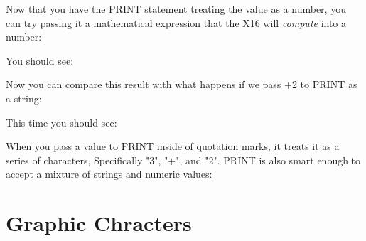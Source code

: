 Now that you have the {\ttfamily PRINT} statement treating the value as a
number, you can try passing it a mathematical expression that the X16 will {\em
compute} into a number:\\


You should see:\\


Now you can compare this result with what happens if we pass {+2} to
{\ttfamily PRINT} as a string:\\


This time you should see:\\


When you pass a value to {\ttfamily PRINT} inside of quotation marks, it treats
it as a series of characters, Specifically "3", "+", and "2".  {\ttfamily
PRINT} is also smart enough to accept a mixture of strings and numeric
values:\\



\chapter*{Graphic Chracters}

